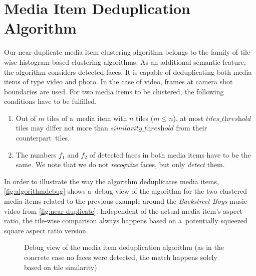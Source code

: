 \documentclass{article}
\begin{document}
\section{Media Item Deduplication Algorithm}
\label{sec:media-item-deduplication-algorithm}

Our near-duplicate media item clustering algorithm belongs to the family of
tile-wise histogram-based clustering algorithms.
As an additional semantic feature, the algorithm considers detected faces.
It is capable of deduplicating both media items of type video and photo.
In the case of video, frames at camera shot boundaries are used. %
For two media items to be clustered,
the following conditions have to be fulfilled.

\begin{enumerate}
  \item Out of $m$ tiles of a~media item with $n$ tiles ($m \leq n$),
    at most $\textit{tiles\_threshold}$ tiles may differ not more than $\textit{similarity\_threshold}$
    from their counterpart~tiles.
  \item The numbers $f_1$ and $f_2$ of detected faces in both media items
    have to be the same.
    We note that we do not \emph{recognize} faces, but only \emph{detect} them.
\end{enumerate}

In order to illustrate the way the algorithm deduplicates media items,
\autoref{fig:algorithmdebug} shows a~debug view of the algorithm
for the two clustered media items related to the previous example around the
\emph{Backstreet Boys} music video from \autoref{fig:near-duplicate}.
Independent of the actual media item's aspect ratio,
the tile-wise comparison always happens based on a~potentially squeezed
square aspect ratio version.

\begin{figure}[b!]
  \centering
  \caption{Debug view of the media item deduplication algorithm
    (as in the concrete case no faces were detected,
    the match happens solely based on tile similarity)}
  \label{fig:algorithmdebug}  
\end{figure}
\end{document}
